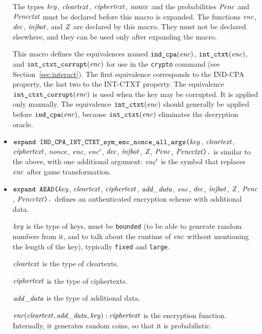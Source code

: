 \documentclass{article}
\begin{document}
\begin{itemize}
   The types $\mathit{key}$, $\mathit{cleartext}$,
   $\mathit{ciphertext}$, $\mathit{nonce}$ and the probabilities $\mathit{Penc}$ and $\mathit{Pencctxt}$ must
   be declared before this macro is expanded. The functions
   $\mathit{enc}$, $\mathit{dec}$, $\mathit{injbot}$, and $\mathit{Z}$ are declared by this
   macro. They must not be declared elsewhere, and they can be used
   only after expanding the macro.

   This macro defines the equivalences named $\texttt{ind\_cpa}(\mathit{enc})$,
   $\texttt{int\_ctxt}(\mathit{enc})$, and $\texttt{int\_ctxt\_corrupt}(\mathit{enc})$ 
   for use in the \texttt{crypto} command 
   (see Section~\ref{sec:interact}). 
   The first equivalence corresponds to the
   IND-CPA property, the last two to the INT-CTXT property.
   The equivalence $\texttt{int\_ctxt\_corrupt}(\mathit{enc})$ is used when the
   key may be corrupted. It is applied only manually.
   The equivalence $\texttt{int\_ctxt}(\mathit{enc})$
   should generally be applied before $\texttt{ind\_cpa}(\mathit{enc})$,
   because $\texttt{int\_ctxt}(\mathit{enc})$ eliminates the decryption oracle.

\item $\texttt{expand IND\_CPA\_INT\_CTXT\_sym\_enc\_nonce\_all\_args(}\mathit{key}$,
$  \mathit{cleartext}$, $\mathit{ciphertext}$, $\mathit{nonce}$, $\mathit{enc}$, $\mathit{enc}'$,
$  \mathit{dec}$, $\mathit{injbot}$, $\mathit{Z}$, $\mathit{Penc}$, $\mathit{Pencctxt}\texttt{).}$  is similar to the above,
  with one additional argument: $\mathit{enc}'$ is the symbol that replaces $\mathit{enc}$ after game transformation.

\item $\texttt{expand AEAD(}\mathit{key}$,
$  \mathit{cleartext}$, $\mathit{ciphertext}$, $\mathit{add\_data}$, $\mathit{enc}$,
$  \mathit{dec}$, $\mathit{injbot}$, $\mathit{Z}$, $\mathit{Penc}$, $\mathit{Pencctxt}\texttt{).}$ defines an
authenticated encryption scheme with additional data.

   $\mathit{key}$ is the type of keys, must be \texttt{bounded} (to be able to generate random numbers from it, and to talk about the runtime of $\mathit{enc}$ without mentioning the length of the key), typically \texttt{fixed} and \texttt{large}.

   $\mathit{cleartext}$ is the type of cleartexts.

   $\mathit{ciphertext}$ is the type of ciphertexts.

   $\mathit{add\_data}$ is the type of additional data.

   $\mathit{enc}(\mathit{cleartext}, \mathit{add\_data}, \mathit{key}): \mathit{ciphertext}$ is the encryption function. Internally, it generates random coins, so that it is probabilistic.


\end{itemize}
\end{document}
